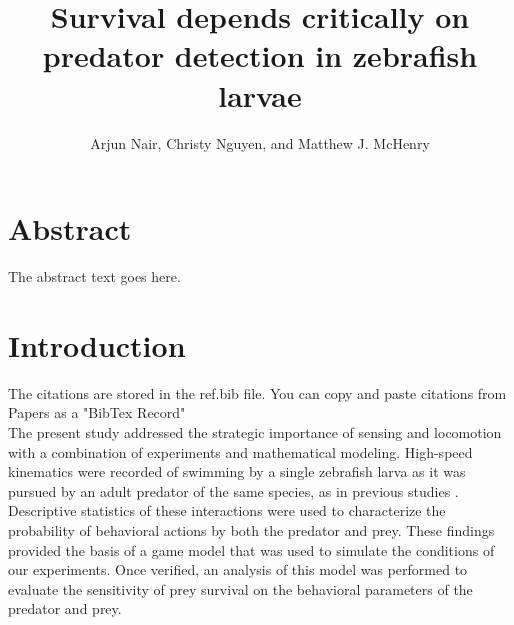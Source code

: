 \documentclass[]{rsos}%
\begin{document}
\title{Survival depends critically on predator detection in zebrafish larvae}

\author{%
Arjun Nair, Christy Nguyen, and Matthew J. McHenry}

\address{Department of Ecology and Evolutionary Biology\\
University of California, Irvine\\
321 Steinhaus Hall\\
Irvine, CA 92697}

\subject{Animal behavior, biomechanics}






\maketitle




\linespread{1.6}\selectfont %


\section*{Abstract}
The abstract text goes here. 

%
\section{Introduction}

The citations are stored in the ref.bib file.  You can copy and paste citations from Papers as a "BibTex Record"
\\
The present study addressed the strategic importance of sensing and locomotion with a combination of experiments and mathematical modeling. 
High-speed kinematics were recorded of swimming by a single zebrafish larva as it was pursued by an adult predator of the same species, as in previous studies \cite{Stewart:2014cma, Soto:2015cj}.
Descriptive statistics of these interactions were used to characterize the probability of behavioral actions by both the predator and prey.
These findings provided the basis of a game model that was used to simulate the conditions of our experiments. 
Once verified, an analysis of this model was performed to evaluate the sensitivity of prey survival on the behavioral parameters of the predator and prey.
\end{document}
